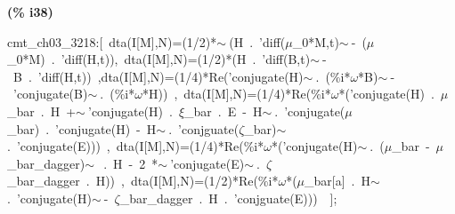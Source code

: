 \documentclass[fleqn]{article}
\begin{document}
\noindent
\begin{minipage}[t]{4.000000em}\color{red}\bfseries
(\% i38)	
\end{minipage}
\begin{minipage}[t]{\textwidth}\color{blue}
cmt\_ch03\_3218:[\ dta(I[M],N)=(1/2)*\ensuremath{\sim\ }(H\ .\ 'diff(\ensuremath{\mu}\_0*M,t)\ensuremath{\sim\ }-\ (\ensuremath{\mu}\_0*M)\ .\ 'diff(H,t)),\ dta(I[M],N)=(1/2)*(H\ .\ 'diff(B,t)\ensuremath{\sim\ }-\ B\ .\ 'diff(H,t))\ ,dta(I[M],N)=(1/4)*Re('conjugate(H)\ensuremath{\sim\ }.\ (\%i*\ensuremath{\omega}*B)\ensuremath{\sim\ }-\ 'conjugate(B)\ensuremath{\sim\ }.\ (\%i*\ensuremath{\omega}*H))\ ,\ dta(I[M],N)=(1/4)*Re(\%i*\ensuremath{\omega}*('conjugate(H)\ .\ \ensuremath{\mu}\_bar\ .\ H\ +\ensuremath{\sim\ }'conjugate(H)\ .\ \ensuremath{\xi}\_bar\ .\ E\ -\ H\ensuremath{\sim\ }.\ 'conjugate(\ensuremath{\mu}\_bar)\ .\ 'conjugate(H)\ -\ H\ensuremath{\sim\ }.\ 'conjguate(\ensuremath{\zeta}\_bar)\ensuremath{\sim\ }.\ 'conjugate(E)))\ ,\ dta(I[M],N)=(1/4)*Re(\%i*\ensuremath{\omega}*('conjugate(H)\ensuremath{\sim\ }.\ (\ensuremath{\mu}\_bar\ -\ \ensuremath{\mu}\_bar\_dagger)\ensuremath{\sim\ }\ .\ H\ -\ 2\ *\ensuremath{\sim\ }'conjugate(E)\ensuremath{\sim\ }.\ \ensuremath{\zeta}\_bar\_dagger\ .\ H))\ ,\ dta(I[M],N)=(1/2)*Re(\%i*\ensuremath{\omega}*(\ensuremath{\mu}\_bar[a]\ .\ H\ensuremath{\sim\ }.\ 'conjugate(H)\ensuremath{\sim\ }-\ \ensuremath{\zeta}\_bar\_dagger\ .\ H\ .\ 'conjguate(E)))\ \ ];
\end{minipage}
\end{document}

